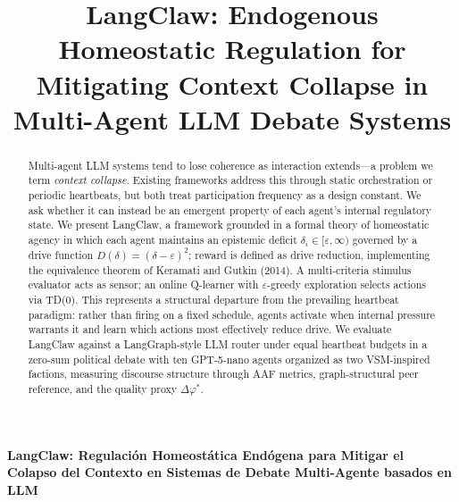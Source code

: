 \documentclass{llncs}
\begin{document}
\title{LangClaw: Endogenous Homeostatic Regulation for Mitigating Context
Collapse in Multi-Agent LLM Debate Systems}

\author{}
\institute{}

\maketitle

\begin{abstract}
Multi-agent LLM systems tend to lose coherence as interaction extends---a
problem we term \emph{context collapse}. Existing frameworks address this
through static orchestration or periodic heartbeats, but both treat
participation frequency as a design constant. We ask whether it can instead
be an emergent property of each agent's internal regulatory state.
We present LangClaw, a framework grounded in a formal theory of homeostatic
agency in which each agent maintains an epistemic deficit
$\delta_i \in [\varepsilon,\infty)$ governed by a drive function
$D(\delta) = (\delta - \varepsilon)^2$; reward is defined as drive reduction,
implementing the equivalence theorem of Keramati and Gutkin (2014). A
multi-criteria stimulus evaluator acts as sensor; an online Q-learner
with $\varepsilon$-greedy exploration selects actions via TD(0). This
represents a structural departure from the prevailing heartbeat paradigm:
rather than firing on a fixed schedule, agents activate when internal
pressure warrants it and learn which actions most effectively reduce drive.
We evaluate LangClaw against a LangGraph-style LLM router under equal
heartbeat budgets in a zero-sum political debate with ten GPT-5-nano agents
organized as two VSM-inspired factions, measuring discourse structure through
AAF metrics, graph-structural peer reference, and the quality proxy
$\Delta\varphi^*$.

\end{abstract}

\begin{center}
\vspace{1cm}
{\Large \bfseries\boldmath LangClaw: Regulaci\'on Homeost\'atica End\'ogena
para Mitigar el Colapso del Contexto en Sistemas de Debate Multi-Agente
basados en LLM}
\vspace{0.5cm}
\end{center}
\end{document}
